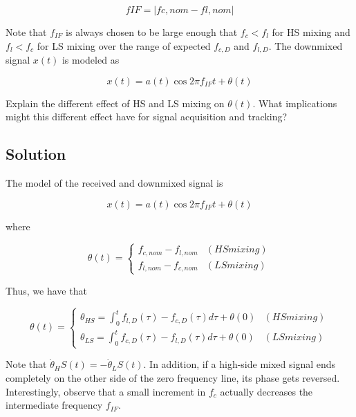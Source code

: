 \begin{equation}
	fIF = |fc,nom − fl,nom |
\end{equation}

Note that $f_{IF}$ is always chosen to be large enough that $f_c < f_l$ for HS
mixing and $f_l < f_c$ for LS mixing over the range of expected $f_{c,D}$ and
$f_{l,D}$. The downmixed signal $x(t)$ is modeled as

\begin{equation}
	x(t) = a(t) \cos{ 2 \pi f_{IF} t + \theta(t)}
\end{equation}

Explain the different effect of HS and LS mixing on $\theta(t)$. What
implications might this different effect have for signal acquisition and
tracking?

\subsection{Solution}

The model of the received and downmixed signal is

\begin{equation}
	x(t) = a(t) \cos{ 2 \pi f_{IF} t + \theta(t)}
\end{equation}

where

\begin{equation}
	\theta(t) =
	\begin{cases}
		f_{c,nom} - f_{l,nom} & (HS mixing) \\
		f_{l,nom} - f_{c,nom} & (LS mixing)
	\end{cases}
\end{equation}

Thus, we have that

\begin{equation}
	\theta(t) =
	\begin{cases}
		\theta_{HS} = \int_0^t f_{l,D}(\tau) - f_{c,D}(\tau) d\tau + \theta(0) & (HS mixing) \\
		\theta_{LS} = \int_0^t f_{c,D}(\tau) - f_{l,D}(\tau) d\tau + \theta(0) & (LS mixing)
	\end{cases}
\end{equation}

Note that $\dot{\theta}_HS(t) = - \dot{\theta}_LS(t)$. In addition, if a
high-side mixed signal ends completely on the other side of the zero frequency
line, its phase gets reversed. Interestingly, observe that a small increment in
$f_c$ actually decreases the intermediate frequency $f_{IF}$.



